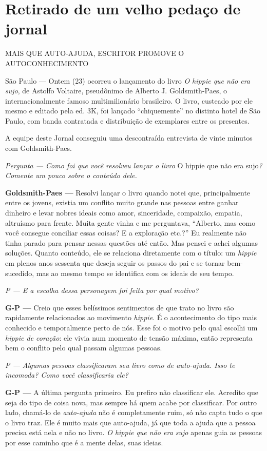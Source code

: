 \chapter{Retirado de um velho pedaço de jornal}

{\Large MAIS QUE AUTO-AJUDA, ESCRITOR PROMOVE O AUTOCONHECIMENTO}

São Paulo --- Ontem (23) ocorreu o lançamento do livro \emph{O hippie que não era sujo}, de Astolfo Voltaire, pseudônimo de Alberto J. Goldsmith-Paes, o internacionalmente famoso multimilionário brasileiro. O livro, custeado por ele mesmo e editado pela ed. 3K, foi lançado ``chiquemente'' no distinto hotel de São Paulo, com banda contratada e distribuição de exemplares entre os presentes.

A equipe deste Jornal conseguiu uma descontraída entrevista de vinte minutos com Goldsmith-Paes.

\emph{Pergunta --- Como foi que você resolveu lançar o livro} O hippie que não era sujo\emph{? Comente um pouco sobre o conteúdo dele.}

\textbf{Goldsmith-Paes ---} Resolvi lançar o livro quando notei que, principalmente entre os jovens, existia um conflito muito grande nas pessoas entre ganhar dinheiro e levar nobres ideais como amor, sinceridade, compaixão, empatia, altruísmo para frente. Muita gente vinha e me perguntava, ``Alberto, mas como você consegue conciliar essas coisas? E a exploração etc.?'' Eu realmente não tinha parado para pensar nessas questões até então. Mas pensei e achei algumas soluções. Quanto conteúdo, ele se relaciona diretamente com o título: um \emph{hippie} em plenos anos sessenta que deseja seguir os passos do pai e se tornar bem-sucedido, mas ao mesmo tempo se identifica com os ideais de seu tempo.

\emph{P --- E a escolha dessa personagem foi feita por qual motivo?}

\textbf{G-P ---} Creio que esses belíssimos sentimentos de que trato no livro são rapidamente relacionados ao movimento \emph{hippie}. É o acontecimento do tipo mais conhecido e temporalmente perto de nós. Esse foi o motivo pelo qual escolhi um \emph{hippie de coração}: ele vivia num momento de tensão máxima, então representa bem o conflito pelo qual passam algumas pessoas.

\emph{P --- Algumas pessoas classificaram seu livro como de \emph{auto-ajuda}. Isso te incomoda? Como você classificaria ele?}

\textbf{G-P ---} A última pergunta primeiro. Eu prefiro não classificar ele. Acredito que seja do tipo de coisa nova, mas sempre há quem acabe por classificar. Por outro lado, chamá-lo de \emph{auto-ajuda} não é completamente ruim, só não capta tudo o que o livro traz. Ele é muito mais que auto-ajuda, já que toda a ajuda que a pessoa precisa está nela e não no livro. \emph{O hippie que não era sujo} apenas guia as pessoas por esse caminho que é a mente delas, suas ideias.

